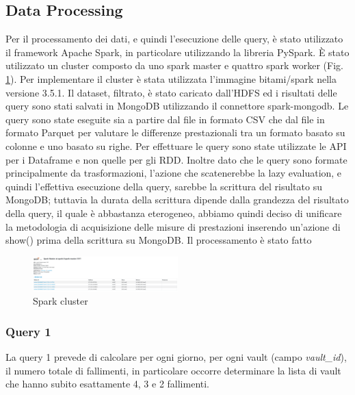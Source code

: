 \documentclass[conference]{IEEEtran}
\begin{document}
\subsection{Data Processing}
Per il processamento dei dati, e quindi l'esecuzione delle query, è stato utilizzato il framework Apache Spark, in particolare utilizzando la libreria PySpark. È stato utilizzato un cluster composto da uno spark master e quattro spark worker (Fig. \ref{fig:spark_cluster}). Per implementare il cluster è stata utilizzata l'immagine bitami/spark nella versione 3.5.1.
Il dataset, filtrato, è stato caricato dall'HDFS ed i risultati delle query sono stati salvati in MongoDB utilizzando il connettore spark-mongodb.
Le query sono state eseguite sia a partire dal file in formato CSV che dal file in formato Parquet per valutare le differenze prestazionali tra un formato basato su colonne e uno basato su righe.
Per effettuare le query sono state utilizzate le API per i Dataframe e non quelle per gli RDD. 
Inoltre dato che le query sono formate principalmente da trasformazioni, l'azione che scatenerebbe la lazy evaluation, e quindi l'effettiva esecuzione della query, sarebbe la scrittura del risultato su MongoDB; tuttavia la durata della scrittura dipende dalla grandezza del risultato della query, il quale è abbastanza eterogeneo, abbiamo quindi deciso di unificare la metodologia di acquisizione delle misure di prestazioni inserendo un'azione di show() prima della scrittura su MongoDB.
Il processamento è stato fatto 




\begin{figure}[H]
    \centering
    \includegraphics[width=0.5\textwidth]{./res/spark_cluster.png}
    \caption{Spark cluster}
    \label{fig:spark_cluster}
\end{figure}
\subsubsection{Query 1}
La query 1 prevede di calcolare per ogni giorno, per ogni vault (campo \textit{vault\_id}), il numero totale di fallimenti, in particolare occorre determinare la lista di vault che hanno subito esattamente 4, 3 e 2 fallimenti.
\end{document}
